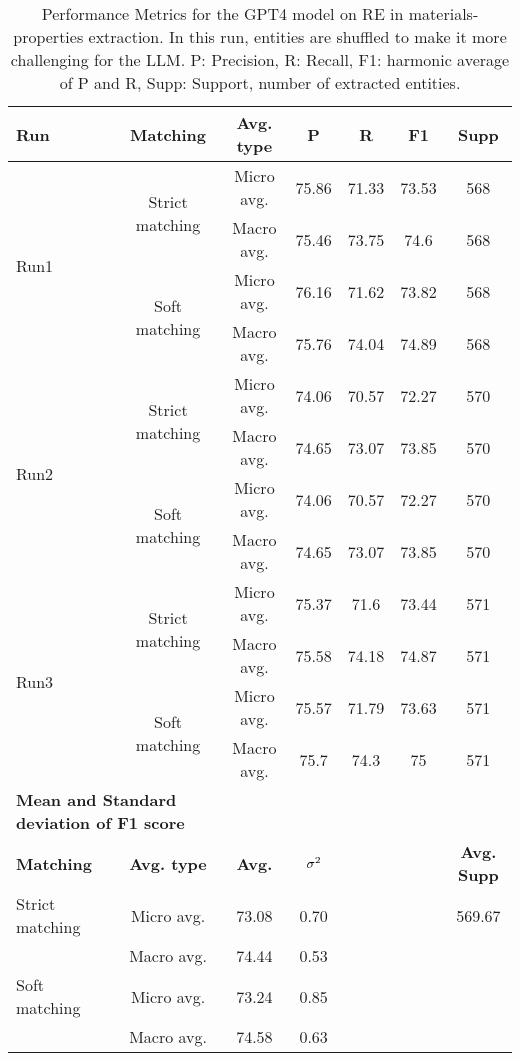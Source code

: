 \begin{table}[htbp]
    \small
    \centering
    \caption{Performance Metrics for the GPT4 model on RE in materials-properties extraction. In this run, entities are shuffled to make it more challenging for the LLM. P: Precision, R: Recall, F1: harmonic average of P and R, Supp: Support, number of extracted entities.}
    \begin{tabular}{lcccccc}
        \toprule
        \textbf{Run} & \textbf{Matching} & \textbf{Avg. type} & \textbf{P} & \textbf{R} & \textbf{F1} & \textbf{Supp} \\
        \midrule
        \multirow{4}{*}{Run1} & \multirow{2}{*}{Strict matching} & Micro avg. & 75.86 & 71.33 & 73.53 & 568 \\
        & & Macro avg. & 75.46 & 73.75 & 74.6 & 568 \\
        \cmidrule{2-7}
        & \multirow{2}{*}{Soft matching} & Micro avg. & 76.16 & 71.62 & 73.82 & 568 \\
        & & Macro avg. & 75.76 & 74.04 & 74.89 & 568 \\
        \midrule
        \multirow{4}{*}{Run2} & \multirow{2}{*}{Strict matching} & Micro avg. & 74.06 & 70.57 & 72.27 & 570 \\
        & & Macro avg. & 74.65 & 73.07 & 73.85 & 570 \\
        \cmidrule{2-7}
        & \multirow{2}{*}{Soft matching} & Micro avg. & 74.06 & 70.57 & 72.27 & 570 \\
        & & Macro avg. & 74.65 & 73.07 & 73.85 & 570 \\
        \midrule
        \multirow{4}{*}{Run3} & \multirow{2}{*}{Strict matching} & Micro avg. & 75.37 & 71.6 & 73.44 & 571 \\
        & & Macro avg. & 75.58 & 74.18 & 74.87 & 571 \\
        \cmidrule{2-7}
        & \multirow{2}{*}{Soft matching} & Micro avg. & 75.57 & 71.79 & 73.63 & 571 \\
        & & Macro avg. & 75.7 & 74.3 & 75 & 571 \\
        \midrule
        \multicolumn{2}{l}{\textbf{Mean and Standard deviation of F1 score}} & & & & & \\
        \midrule
        \textbf{Matching} & \textbf{Avg. type} & \textbf{Avg.} & $\sigma\textsuperscript{2}$ & & & \textbf{Avg. Supp}\\
        Strict matching & Micro avg. & 73.08 & 0.70 & & & 569.67 \\
        & Macro avg. & 74.44 & 0.53 & & & \\
        Soft matching & Micro avg. & 73.24 & 0.85 & & \\
        & Macro avg. & 74.58 & 0.63 & & \\
        \bottomrule
    \end{tabular}
\end{table}

